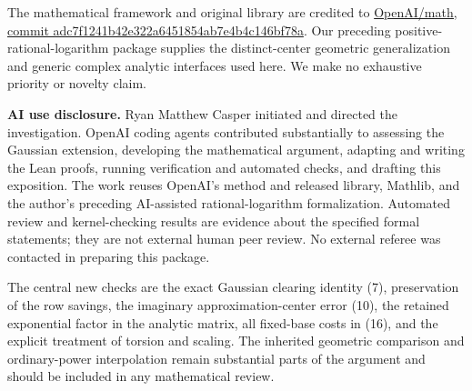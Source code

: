 \documentclass[11pt]{article}
\begin{document}
The mathematical framework and original library are credited to
\href{https://github.com/openai/math/tree/adc7f1241b42e322a6451854ab7e4b4c146bf78a}{OpenAI/math,
commit adc7f1241b42e322a6451854ab7e4b4c146bf78a}. Our preceding
positive-rational-logarithm package supplies the distinct-center
geometric generalization and generic complex analytic interfaces used
here. We make no exhaustive priority or novelty claim.

\textbf{AI use disclosure.} Ryan Matthew Casper initiated and directed
the investigation. OpenAI coding agents contributed substantially to
assessing the Gaussian extension, developing the mathematical argument,
adapting and writing the Lean proofs, running verification and automated
checks, and drafting this exposition. The work reuses OpenAI's method
and released library, Mathlib, and the author's preceding AI-assisted
rational-logarithm formalization. Automated review and kernel-checking
results are evidence about the specified formal statements; they are not
external human peer review. No external referee was contacted in
preparing this package.

The central new checks are the exact Gaussian clearing identity (7),
preservation of the row savings, the imaginary approximation-center
error (10), the retained exponential factor in the analytic matrix, all
fixed-base costs in (16), and the explicit treatment of torsion and
scaling. The inherited geometric comparison and ordinary-power
interpolation remain substantial parts of the argument and should be
included in any mathematical review.
\end{document}
